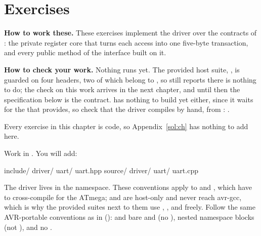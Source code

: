 
\section{Exercises}
\label{c7:sec:exercises}\label{c7:app:b}

\begin{aside}
\textbf{How to work these.} These exercises implement the  driver over the contracts of
: the private register core that turns each access into one five-byte transaction, and
every public method of the interface built on it.

\textbf{How to check your work.} Nothing runs yet. The provided host suite,
, is guarded on four headers, two of which belong to ,
so  still reports there is nothing to do; the check on this work arrives in the next
chapter, and until then the specification below is the contract.  has nothing to
build yet either, since it waits for the  that  provides, so check
that the driver compiles by hand, from :
.

Every exercise in this chapter is code, so Appendix~\ref{sol:ch} has nothing to add here.
\end{aside}

Work in . You will add:

\begin{console}
include/
    driver/
        uart/
            uart.hpp
source/
    driver/
        uart/
            uart.cpp
\end{console}

The driver lives in the  namespace. These conventions apply to 
and , which have to cross-compile for the ATmega;  and
 are host-only and never reach avr-gcc, which is why the provided suites
next to them use , ,  and
\code{[[nodiscard]]} freely. Follow the same AVR-portable conventions as in 
():  and bare  and  (no
), nested namespace blocks (not ), and no
\code{[[nodiscard]]}.

\label{c7:set:1}

